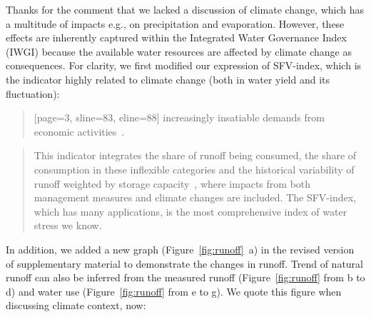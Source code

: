 \AR{} Thanks for the comment that we lacked a discussion of climate change, which has a multitude of impacts e.g., on precipitation and evaporation.
However, these effects are inherently captured within the Integrated Water Governance Index (IWGI) because the available water resources are affected by climate change as consequences.
For clarity, we first modified our expression of SFV-index, which is the indicator highly related to climate change (both in water yield and its fluctuation):

\begin{quote}[page=3, sline=83, eline=88]
	\DIFaddend increasingly insatiable demands from economic activities\DIFdelbegin {}\DIFdelend \DIFaddbegin {}\DIFaddend~\cite{qin2019,wada2014,huang2021}.
\end{quote}

\begin{quote}
	This indicator integrates the share of runoff being consumed, the share of consumption in these inflexible categories and the historical variability of runoff weighted by storage capacity~\cite{qin2019}, where impacts from both management measures and climate changes are included. The SFV-index, which has many applications, is the most comprehensive index of water stress we know.
\end{quote}

\AR*{} In addition, we added a new graph (Figure~\ref{fig:runoff}~a) in the revised version of supplementary material to demonstrate the changes in runoff. Trend of natural runoff can also be inferred from the measured runoff (Figure~\ref{fig:runoff} from b to d) and water use (Figure~\ref{fig:runoff} from e to g). We quote this figure when discussing climate context, now:


